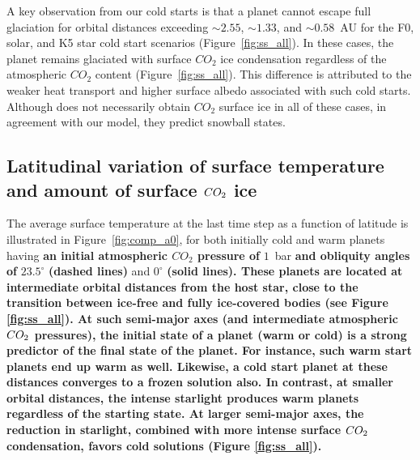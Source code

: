 \documentclass[fleqn,usenatbib]{mnras}
\providecommand{\DIFadd}[1]{{\bf #1}} %
\providecommand{\DIFdel}[1]{} %
\providecommand{\DIFaddbegin}{} %
\providecommand{\DIFaddend}{} %
\providecommand{\DIFdelbegin}{} %
\providecommand{\DIFdelend}{} %
\newcommand{\DIFscaledelfig}{0.5}
\newlength{\DIFdelgraphicswidth} %
\newlength{\DIFdelgraphicsheight} %
\newcommand{\DIFaddincludegraphics}[2][]{{\color{blue}\fbox{\DIFOincludegraphics[#1]{#2}}}} %
\newcommand{\DIFdelincludegraphics}[2][]{%
\sbox{\DIFdelgraphicsbox}{\DIFOincludegraphics[#1]{#2}}%
\settoboxwidth{\DIFdelgraphicswidth}{\DIFdelgraphicsbox} %
\settoboxtotalheight{\DIFdelgraphicsheight}{\DIFdelgraphicsbox} %
\scalebox{\DIFscaledelfig}{%
\parbox[b]{\DIFdelgraphicswidth}{\usebox{\DIFdelgraphicsbox}\\[-\baselineskip] \rule{\DIFdelgraphicswidth}{0em}}\llap{\resizebox{\DIFdelgraphicswidth}{\DIFdelgraphicsheight}{%
\setlength{\unitlength}{\DIFdelgraphicswidth}%
\begin{picture}(1,1)%
\thicklines\linethickness{2pt} %
{\color[rgb]{1,0,0}\put(0,0){\framebox(1,1){}}}%
{\color[rgb]{1,0,0}\put(0,0){\line( 1,1){1}}}%
{\color[rgb]{1,0,0}\put(0,1){\line(1,-1){1}}}%
\end{picture}%
}\hspace*{3pt}}} %
} %
\DeclareRobustCommand{\DIFaddbegin}{\DIFOaddbegin \let\includegraphics\DIFaddincludegraphics} %
\DeclareRobustCommand{\DIFaddend}{\DIFOaddend \let\includegraphics\DIFOincludegraphics} %
\DeclareRobustCommand{\DIFdelbegin}{\DIFOdelbegin \let\includegraphics\DIFdelincludegraphics} %
\DeclareRobustCommand{\DIFdelend}{\DIFOaddend \let\includegraphics\DIFOincludegraphics} %
\begin{document}
A key observation from our cold starts is that a planet cannot escape full glaciation for orbital distances exceeding $\sim 2.55$\DIFdelbegin \DIFdel{~AU}\DIFdelend , $\sim1.33$\DIFdelbegin \DIFdel{~AU}\DIFdelend , and $\sim0.58$~AU for the F0, solar, and K5 star cold start scenarios (Figure~\ref{fig:ss_all}). In these cases, the planet remains glaciated with surface $CO_{\mathrm{2}}$ ice condensation regardless of the atmospheric $CO_{\mathrm{2}}$ content (Figure~\ref{fig:ss_all}). This difference is attributed to the weaker heat transport and higher surface albedo associated with such cold starts. Although \citet{Turbet2017} does not necessarily obtain $CO_{\mathrm{2}}$ surface ice in all of these cases, in agreement with our model, they predict snowball states. 

\DIFaddbegin 

\DIFaddend \subsection{Latitudinal variation of surface temperature \DIFaddbegin \DIFadd{and amount of surface $CO_{\rm 2}$ ice}\DIFaddend }
\label{sec:surf_temp}
The  average surface temperature at the last time step as a function of latitude is illustrated in Figure~\ref{fig:comp_a0}, for both initially cold and warm planets having \DIFaddbegin \DIFadd{an initial atmospheric $CO_{\mathrm{2}}$ pressure of }\DIFaddend $1$~bar \DIFdelbegin \DIFdel{of $CO_{\mathrm{2}}$ in their atmospheres and obliquities }\DIFdelend \DIFaddbegin \DIFadd{and obliquity angles of }\DIFaddend $23.5^{\circ}$ \DIFaddbegin \DIFadd{(dashed lines) }\DIFaddend and $0^{\circ}$ \DIFdelbegin \DIFdel{. }\DIFdelend \DIFaddbegin \DIFadd{(solid lines). These planets are located at intermediate orbital distances from the host star, close to the transition between ice-free and fully ice-covered bodies (see Figure \ref{fig:ss_all}). At such semi-major axes (and intermediate atmospheric $CO_{\rm 2}$ pressures), the initial state of a planet (warm or cold) is a strong predictor of  the final state of the planet. For instance, such warm start planets end up warm as well. Likewise, a cold start planet at these distances converges to a frozen solution also. In contrast, at smaller  orbital distances, the intense starlight produces warm planets regardless of the starting state. At larger semi-major axes, the reduction in starlight, combined with more intense surface $CO_{\rm 2}$ condensation, favors cold solutions (Figure \ref{fig:ss_all}). 
}
\end{document}
